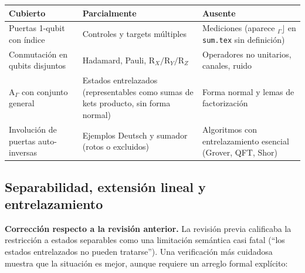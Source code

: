 \documentclass[12pt, a4paper]{article}
\newcommand{\gate}[1]{\text{#1}}
\begin{document}
\begin{longtable}{p{4cm} p{4cm} p{4.5cm}}
  \toprule
  \textbf{Cubierto}                      & \textbf{Parcialmente}                               & \textbf{Ausente}               \\
  \midrule
  Puertas 1-qubit con índice             & Controles y targets múltiples                       & Mediciones
  (aparece $_{{\Gamma}}\rfloor$ en \texttt{sum.tex} sin definición)                                                             \\
  \addlinespace
  Conmutación en qubits disjuntos        & Hadamard, Pauli, $\gate{R}_X/\gate{R}_Y/\gate{R}_Z$ &
  Operadores no unitarios, canales, ruido                                                                                       \\
  \addlinespace
  $\gate{A}_\Gamma$ con conjunto general & Estados entrelazados (representables como sumas de
  kets producto, sin forma normal)       & Forma normal y lemas de factorización                                                \\
  \addlinespace
  Involución de puertas auto-inversas    & Ejemplos Deutsch y sumador (rotos o excluidos)      & Algoritmos con entrelazamiento
  esencial (Grover, QFT, Shor)                                                                                                  \\
  \bottomrule
\end{longtable}

\subsection{Separabilidad, extensión lineal y entrelazamiento}
\label{sec:entrelazamiento}

\textbf{Corrección respecto a la revisión anterior.}
La revisión previa calificaba la restricción a estados separables como una
limitación semántica casi fatal (``los estados entrelazados no pueden
tratarse''). Una verificación más cuidadosa muestra que la situación es
mejor, aunque requiere un arreglo formal explícito:
\end{document}
